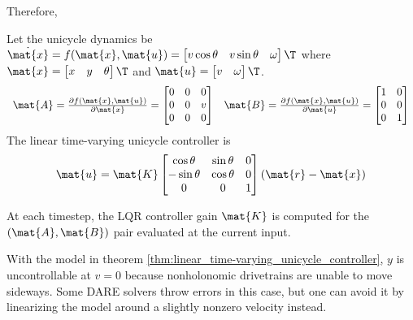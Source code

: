Therefore,
\begin{theorem}
  \label{thm:linear_time-varying_unicycle_controller}

  Let the unicycle dynamics be
  $\dot{\mat{x}} = f(\mat{x}, \mat{u}) =
  \begin{bmatrix}
    v\cos\theta &
    v\sin\theta &
    \omega
  \end{bmatrix}\T$ where
  $\mat{x} =
  \begin{bmatrix}
    x &
    y &
    \theta
  \end{bmatrix}\T$ and
  $\mat{u} =
  \begin{bmatrix}
    v &
    \omega
  \end{bmatrix}\T$.
  \begin{equation}
    \begin{array}{cc}
      \mat{A} = \frac{\partial f(\mat{x}, \mat{u})}{\partial\mat{x}} =
      \begin{bmatrix}
        0 & 0 & 0 \\
        0 & 0 & v \\
        0 & 0 & 0
      \end{bmatrix} &
      \mat{B} = \frac{\partial f(\mat{x}, \mat{u})}{\partial\mat{u}} =
      \begin{bmatrix}
        1 & 0 \\
        0 & 0 \\
        0 & 1
      \end{bmatrix}
    \end{array}
  \end{equation}
  The linear time-varying unicycle controller is
  \begin{equation}
    \mat{u} = \mat{K}
    \begin{bmatrix}
      \cos\theta & \sin\theta & 0 \\
      -\sin\theta & \cos\theta & 0 \\
      0 & 0 & 1
    \end{bmatrix}
    (\mat{r} - \mat{x})
  \end{equation}

  At each timestep, the LQR controller gain $\mat{K}$ is computed for the
  $(\mat{A}, \mat{B})$ pair evaluated at the current input.
\end{theorem}

With the \gls{model} in theorem
\ref{thm:linear_time-varying_unicycle_controller}, $y$ is uncontrollable at
$v = 0$ because nonholonomic drivetrains are unable to move sideways. Some DARE
solvers throw errors in this case, but one can avoid it by linearizing the model
around a slightly nonzero velocity instead.

